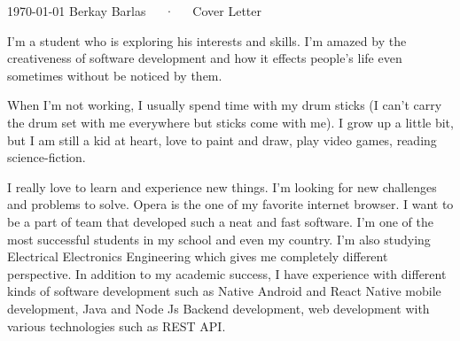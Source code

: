 \documentclass[11pt, a4paper]{awesome-cv}
\begin{document}
\makecvheader[R]

\makecvfooter
  {\today}
  {Berkay Barlas~~~·~~~Cover Letter}
  {}

\makelettertitle

\begin{cvletter}

	I'm a student who is exploring his interests and skills. I'm amazed by the creativeness of software development and how it effects people’s life even sometimes without be noticed by them. 

	When I'm not working, I usually spend time with my drum sticks (I can’t carry the drum set with me everywhere but sticks come with me). I grow up a little bit, but I am still a kid at heart, love to paint and draw, play video games, reading science-fiction.

	I really love to learn and experience new things. I'm looking for new challenges and problems to solve. 
	Opera is the one of my favorite internet browser. I want to be a part of team that developed such a neat and fast software. 
I'm one of the most successful students in my school and even my country. I'm also studying Electrical {\enskip\cdotp\enskip} Electronics Engineering which gives me completely different perspective. In addition to my academic success, I have experience with different kinds of software development such as Native Android and React Native mobile development, Java and Node Js Backend development, web development with various technologies such as REST API.



\end{cvletter}


\makeletterclosing
\end{document}
